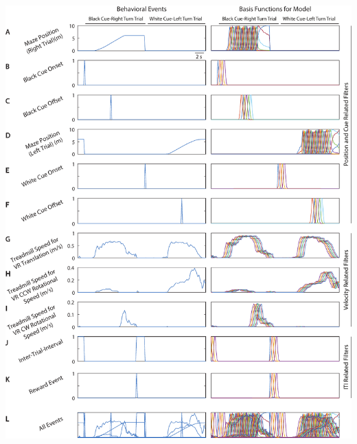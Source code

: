 \begin{FPfigure}
\includegraphics[width=\textwidth]{figures/4_filters.pdf}
\caption[Basis functions for encoding model.]{\textbf{Basis functions for encoding model.} Trial and behavioral measurements during each imaging frame (left) were expanded into a set of basis functions that were incorporated into the GLM (right). Filter groupings used in contribution calculation for Figure \ref{fig:6_decoding} shown in right margin.
\textbf{a,} Left: Maze position on right turn trials. Right: 36 spatial boxcar filters of position spanning the length of the maze were convolved with a Gaussian filter for right turn trials. 
%
\textbf{b,} Left: Black cue onset. Right: 4 Gaussian basis functions that span the first 2 seconds of black cue-right turn trials. 
%
\textbf{c,} Left: Black cue offset (delay period onset). Right: 6 total basis functions, 2 basis functions extended for 1 second preceding cue offset and 4 basis functions extended for 2 seconds following cue offset.
%
\textbf{d,} Left: Maze position on left turn trials. Right: 36 spatial boxcar filters of position spanning the length of the maze were convolved with a Gaussian filter for left turn trials.
}
\end{FPfigure}
